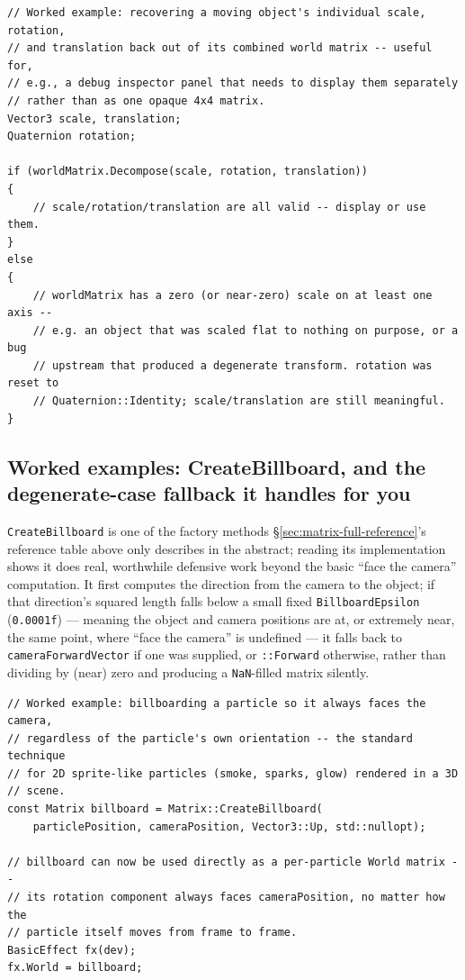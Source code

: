 \begin{lstlisting}
// Worked example: recovering a moving object's individual scale, rotation,
// and translation back out of its combined world matrix -- useful for,
// e.g., a debug inspector panel that needs to display them separately
// rather than as one opaque 4x4 matrix.
Vector3 scale, translation;
Quaternion rotation;

if (worldMatrix.Decompose(scale, rotation, translation))
{
    // scale/rotation/translation are all valid -- display or use them.
}
else
{
    // worldMatrix has a zero (or near-zero) scale on at least one axis --
    // e.g. an object that was scaled flat to nothing on purpose, or a bug
    // upstream that produced a degenerate transform. rotation was reset to
    // Quaternion::Identity; scale/translation are still meaningful.
}
\end{lstlisting}

\subsection{Worked examples: CreateBillboard, and the degenerate-case fallback it handles for you}

\texttt{CreateBillboard} is one of the factory methods \S\ref{sec:matrix-full-reference}'s
reference table above only describes in the abstract; reading its implementation shows it does
real, worthwhile defensive work beyond the basic ``face the camera'' computation. It first
computes the direction from the camera to the object; if that direction's squared length falls
below a small fixed \texttt{BillboardEpsilon} (\texttt{0.0001f}) --- meaning the object and
camera positions are at, or extremely near, the same point, where ``face the camera'' is
undefined --- it falls back to \texttt{cameraForwardVector} if one was supplied, or
\texttt{::Forward} otherwise, rather than dividing by (near) zero and
producing a \texttt{NaN}-filled matrix silently.

\begin{lstlisting}
// Worked example: billboarding a particle so it always faces the camera,
// regardless of the particle's own orientation -- the standard technique
// for 2D sprite-like particles (smoke, sparks, glow) rendered in a 3D
// scene.
const Matrix billboard = Matrix::CreateBillboard(
    particlePosition, cameraPosition, Vector3::Up, std::nullopt);

// billboard can now be used directly as a per-particle World matrix --
// its rotation component always faces cameraPosition, no matter how the
// particle itself moves from frame to frame.
BasicEffect fx(dev);
fx.World = billboard;
\end{lstlisting}

